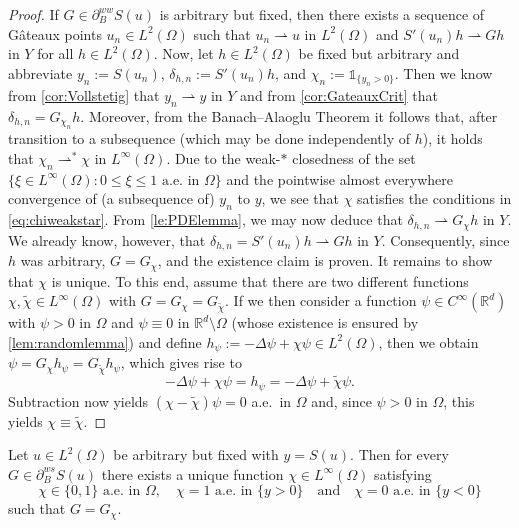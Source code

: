 \documentclass[reqno]{shinyart}
\begin{document}
\begin{proof}
    If $G \in  \partial_{B}^{ww} S(u)$ is arbitrary but fixed, 
    then there exists a sequence of G\^ateaux points $u_n \in L^2(\Omega) $ such that  
    $u_n \rightharpoonup u$ in $L^2(\Omega)$ and $S'(u_n)h {\rightharpoonup} G h$ in $Y$ 
    for all $h \in L^2(\Omega)$. 
    Now, let $h\in L^2(\Omega)$ be fixed but arbitrary and abbreviate  
    $y_n := S(u_n)$, $\delta_{h,n} := S'(u_n)h$, and $\chi_n :=  \mathbb{1}_{\{y_n >0\}}$.
    Then we know from \cref{cor:Vollstetig} that $y_n \rightharpoonup y$ in $Y$ 
    and from \cref{cor:GateauxCrit} that $\delta_{h,n} = G_{\chi_n} h$.
    Moreover, from the Banach--Alaoglu Theorem it follows that, 
    after transition to a subsequence (which may be done independently of $h$), 
    it holds that $\chi_n {\rightharpoonup}^{*} \chi$ in $L^\infty(\Omega)$.
    Due to the weak-$\ast$ closedness of the set
    $\{\xi\in L^\infty(\Omega): 0\leq \xi\leq 1 \text{ a.e.\ in }\Omega\}$ and the 
    pointwise almost everywhere convergence of (a subsequence of) $y_n$ to $y$, we see
    that $\chi$ satisfies the conditions in \eqref{eq:chiweakstar}. 
    From \cref{le:PDElemma}, we may now deduce that $\delta_{h,n} {\rightharpoonup} G_\chi h$ in $Y$. 
    We already know, however, that $\delta_{h,n} = S'(u_n)h \rightharpoonup G h$ in $Y$. 
    Consequently, since $h$ was arbitrary, $G = G_\chi$, and the existence claim is proven. 
    It remains to show that $\chi$ is unique. To this end, assume that there are two different 
    functions $\chi, \tilde{\chi} \in L^\infty(\Omega)$ with $G = G_\chi = G_{\tilde\chi}$. 
    If we then consider a function $\psi \in C^\infty({\mathbb{R}}^d)$ with $\psi > 0$ in $\Omega$ 
    and $\psi \equiv 0$ in ${\mathbb{R}}^d \setminus \Omega$ (whose existence is ensured by 
    \cref{lem:randomlemma}) and define $h_{\psi} :=  -\Delta \psi +\chi \psi \in L^2(\Omega)$, 
    then we obtain $\psi = G_\chi h_\psi = G_{\tilde\chi} h_\psi$, which gives rise to 
    \begin{equation*}
        -\Delta \psi+\chi \psi= h_{\psi} =  -\Delta \psi+\tilde{\chi} \psi.
    \end{equation*}
    Subtraction now yields $(\chi - \tilde{\chi})\psi = 0$ a.e.\ in $\Omega$ and, 
    since $\psi > 0$ in $\Omega$, this yields $\chi \equiv \tilde{\chi}$.
\end{proof}

\begin{proposition}\label{prop:necessarystrong}
    Let $u \in L^2(\Omega)$ be arbitrary but fixed with $y = S(u)$. 
    Then for every $G \in  \partial_{B}^{ws} S(u)$  
    there exists a unique function $\chi \in L^\infty(\Omega)$ satisfying
    \begin{equation}\label{eq:chistrong}
        \chi \in \{0, 1\} \text{ a.e.\ in }\Omega, \quad \chi = 1 \text{ a.e.\ in } \{y > 0\}
        \quad \text{and} \quad \chi = 0 \text{ a.e.\ in } \{y < 0\}
    \end{equation}
    such that $G = G_\chi$.
\end{proposition}
\end{document}
